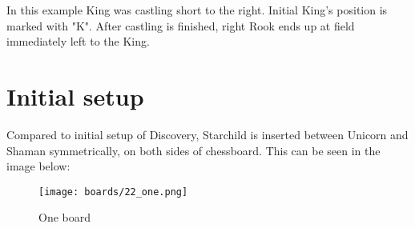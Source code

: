 In this example King was castling short to the right. Initial King's position is marked with "K".
After castling is finished, right Rook ends up at field immediately left to the King.

\clearpage %

\section*{Initial setup}

Compared to initial setup of Discovery, Starchild is inserted between Unicorn and Shaman
symmetrically, on both sides of chessboard. This can be seen in the image below:

\noindent
\begin{figure}[h]
\texttt{[image: boards/22\_one.png]}
\caption{One board}
\label{fig:22_one}
\end{figure}

\clearpage %
